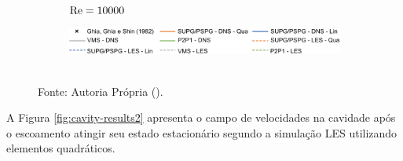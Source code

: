 \begin{figure}[h!]
\begin{subfigure}{0.4\textwidth}
        \caption{$\mathrm{Re}=10000$}
    \end{subfigure}
    \begin{subfigure}{\textwidth}
        \centering
        \includegraphics[width=.7\linewidth]{Figuras/Cavity/legenda.pdf}
    \end{subfigure}
    \\Fonte: Autoria Própria (\the\year).
    \label{fig:cavity-results}
\end{figure}

A Figura \ref{fig:cavity-results2} apresenta o campo de velocidades na cavidade após o escoamento atingir seu estado estacionário segundo a simulação LES utilizando elementos quadráticos.

